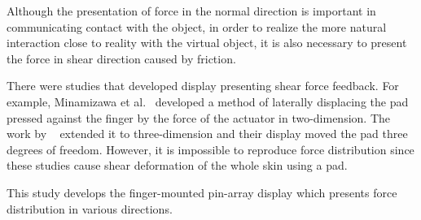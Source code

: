 Although the presentation of force in the normal direction is important in communicating contact with the object, in order to realize the more natural interaction close to reality with the virtual object, it is also necessary to present the force in shear direction caused by friction.

There were studies that developed display presenting shear force feedback.
For example, Minamizawa et al.~\cite{Minamizawa:2007:GGW:1278280.1278289} developed a method of laterally displacing the pad pressed against the finger by the force of the actuator in two-dimension. 
The work by ~\cite{6636291,Schorr:2017:FTD:3025453.3025744} extended it to three-dimension and their display moved the pad three degrees of freedom.
However, it is impossible to reproduce force distribution since these studies cause shear deformation of the whole skin using a pad.

This study develops the finger-mounted pin-array display which presents force distribution in various directions.

